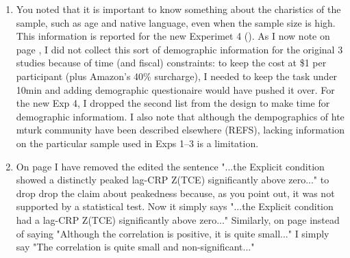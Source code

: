 \documentclass[12pt]{article}
\begin{document}
\begin{enumerate}
\item
	You noted that it is important to know something about the charistics of the sample, such as age and native language, even when the sample size is high. This information is reported for the new Experimet 4 (\pageref{TODO-9}). As I now note on page \pageref{TODO-10}, I did not collect this sort of demographic information for the original 3 studies because of time (and fiscal) constraints: to keep the cost at \$1 per participant (plus Amazon's 40\% surcharge), I needed to keep the task under 10min and adding demographic questionaire would have pushed it over. For the new Exp 4, I dropped the second list from the design to make time for demographic informatiom. I also note that although the dempographics of hte mturk community have been described elsewhere (REFS), lacking information on the particular sample used in Exps 1--3 is a limitation.

\item
	On page \pageref{done-11} I have removed the edited the sentence "...the Explicit condition showed a distinctly peaked lag-CRP Z(TCE) significantly above zero..." to drop drop the claim about peakedness because, as you point out, it was not supported by a statistical test. Now it simply says "...the Explicit condition had a lag-CRP Z(TCE) significantly above zero..."
	Similarly, on page \pageref{done-12} instead of saying "Although the correlation is positive, it is quite small..." I simply say "The correlation is quite small and non-significant..."


\end{enumerate}
\end{document}
